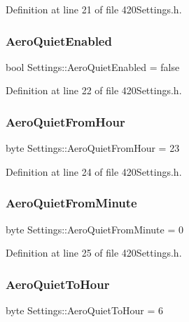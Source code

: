 Definition at line 21 of file 420\+Settings.\+h.

\mbox{\label{struct_settings_a616ff00e526ffdde8dfe160f040a4588}} 
\subsubsection{\texorpdfstring{AeroQuietEnabled}{AeroQuietEnabled}}
{\footnotesize\ttfamily bool Settings\+::\+Aero\+Quiet\+Enabled = false}



Definition at line 22 of file 420\+Settings.\+h.

\mbox{\label{struct_settings_a01f77faaf53b335dc6dd418afc128082}} 
\subsubsection{\texorpdfstring{AeroQuietFromHour}{AeroQuietFromHour}}
{\footnotesize\ttfamily byte Settings\+::\+Aero\+Quiet\+From\+Hour = 23}



Definition at line 24 of file 420\+Settings.\+h.

\mbox{\label{struct_settings_ae7b548ea9b04e4a04917f47e28a2e0d3}} 
\subsubsection{\texorpdfstring{AeroQuietFromMinute}{AeroQuietFromMinute}}
{\footnotesize\ttfamily byte Settings\+::\+Aero\+Quiet\+From\+Minute = 0}



Definition at line 25 of file 420\+Settings.\+h.

\mbox{\label{struct_settings_a502dde4abda23990af4a691588485a01}} 
\subsubsection{\texorpdfstring{AeroQuietToHour}{AeroQuietToHour}}
{\footnotesize\ttfamily byte Settings\+::\+Aero\+Quiet\+To\+Hour = 6}



